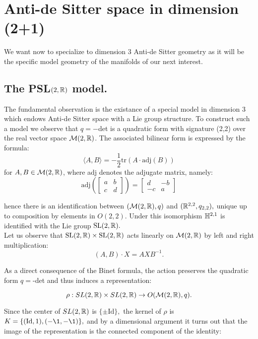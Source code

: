 \chapter{Anti-de Sitter space in dimension (2+1)}
We want now to specialize to dimension 3 Anti-de Sitter geometry as it will be the specific model geometry of the manifolds of our next interest. 
\section{The {PSL}$(2,\mathbb{R})$ model.} 

The fundamental observation is the existance of a special model in dimension 3 which endows Anti-de Sitter space with a Lie group structure. To construct such a model we observe that $q=-$det is a quadratic form with signature (2,2) over the real vector space $\mathcal{M}(2,\mathbb{R})$. The associated bilinear form is expressed by the formula:
\begin{equation}\label{quadratic}
    \langle A,B\rangle=-\frac{1}{2}\text{tr}(A\cdot\text{adj}(B))
\end{equation}
for $A,B\in\mathcal{M}(2,\mathbb{R})$, where adj denotes the adjugate matrix, namely: 
\[
    \text{adj}(\begin{bmatrix}
        a & b \\
        c & d
    \end{bmatrix}) = \begin{bmatrix}
        d & -b \\
        -c & a
    \end{bmatrix}
\]

hence there is an identification between $(\mathcal{M}(2,\mathbb{R}),q)$ and $(\mathbb{R}^{2,2}, q_{2,2}),$ unique up to composition by elements in $O(2,2)$. Under this isomorphism $\mathbb{H}^{2,1}$ is identified with the Lie group $\text{SL}(2,\mathbb{R}).$\\
Let us observe that $\text{SL}(2,\mathbb{R})\times \text{SL}(2,\mathbb{R})$ acts linearly on $\mathcal{M}(2,\mathbb{R})$ by left and right multiplication:
$$(A,B)\cdot X=AXB^{-1}.$$

As a direct consequence of the Binet formula, the action preserves the quadratic form $q=$-det and thus induces a representation: 

\[ \rho:SL(2,\mathbb{R})\times SL(2,\mathbb{R})\to O(\mathcal{M}(2,\mathbb{R}),q). \]

Since the center of $SL(2,\mathbb{R})$ is $\{\pm \text{Id}\},$ the kernel of $\rho$ is $K=\{(\text{Id},1),(-\1,-\1)\},$ and by a dimensional argument it turns out that the image of the representation is the connected component of the identity: 

